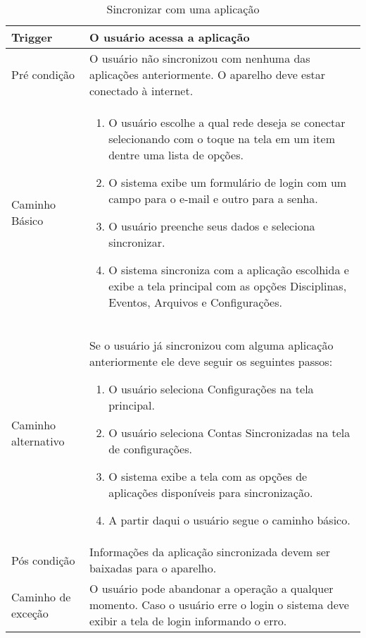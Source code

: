 \begin{table}[H]
  \begin{tabular}{ p{} | p{} }
    Trigger & O usuário acessa a aplicação\\
    \hline
    Pré condição & O usuário não sincronizou com nenhuma das aplicações anteriormente. O aparelho deve estar conectado à internet.\\
    \hline
    Caminho Básico &
    \begin{minipage}{5in}
      \vskip 4pt
      \begin{enumerate}
        \item O usuário escolhe a qual rede deseja se conectar selecionando com o toque na tela em um item dentre uma lista de opções.
        \item O sistema exibe um formulário de login com um campo para o e-mail e outro para a senha.
        \item O usuário preenche seus dados e seleciona sincronizar.
        \item O sistema sincroniza com a aplicação escolhida e exibe a tela principal com as opções Disciplinas, Eventos, Arquivos e Configurações.
      \end{enumerate}
      \vskip 4pt
    \end{minipage} \\
    \hline
    Caminho alternativo &
    \begin{minipage}{5in}
      \vskip 4pt
      Se o usuário já sincronizou com alguma aplicação anteriormente ele deve seguir os seguintes passos:
      \begin{enumerate}
        \item O usuário seleciona Configurações na tela principal.
        \item O usuário seleciona Contas Sincronizadas na tela de configurações.
        \item O sistema exibe a tela com as opções de aplicações disponíveis para sincronização.
        \item A partir daqui o usuário segue o caminho básico.
      \end{enumerate}
      \vskip 4pt
    \end{minipage} \\
    \hline
    Pós condição & Informações da aplicação sincronizada devem ser baixadas para o aparelho.\\
    \hline
    Caminho de exceção & O usuário pode abandonar a operação a qualquer momento. Caso o usuário erre o login o sistema deve exibir a tela de login informando o erro.
  \end{tabular}
  \caption{Sincronizar com uma aplicação}
  \label{table:sincronizacao}
\end{table}

